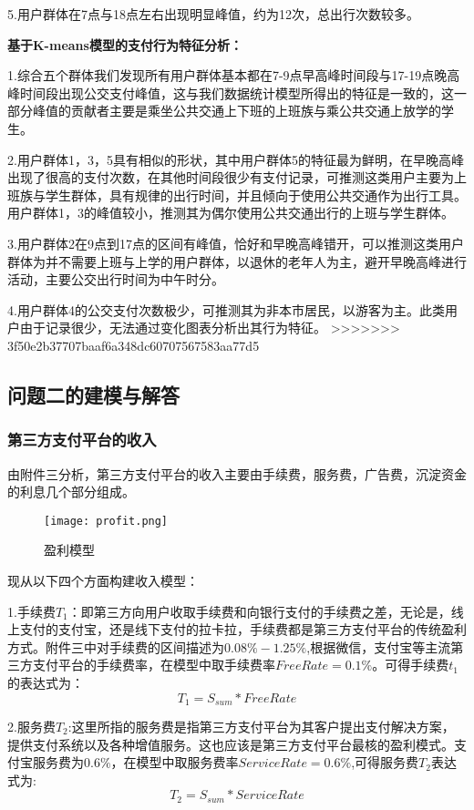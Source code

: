 \documentclass[withoutpreface,bwprint]{cumcmthesis} %
\begin{document}
5.用户群体在7点与18点左右出现明显峰值，约为12次，总出行次数较多。

\textbf{基于K-means模型的支付行为特征分析：}

1.综合五个群体我们发现所有用户群体基本都在7-9点早高峰时间段与17-19点晚高峰时间段出现公交支付峰值，这与我们数据统计模型所得出的特征是一致的，这一部分峰值的贡献者主要是乘坐公共交通上下班的上班族与乘公共交通上放学的学生。

2.用户群体1，3，5具有相似的形状，其中用户群体5的特征最为鲜明，在早晚高峰出现了很高的支付次数，在其他时间段很少有支付记录，可推测这类用户主要为上班族与学生群体，具有规律的出行时间，并且倾向于使用公共交通作为出行工具。用户群体1，3的峰值较小，推测其为偶尔使用公共交通出行的上班与学生群体。

3.用户群体2在9点到17点的区间有峰值，恰好和早晚高峰错开，可以推测这类用户群体为并不需要上班与上学的用户群体，以退休的老年人为主，避开早晚高峰进行活动，主要公交出行时间为中午时分。

4.用户群体4的公交支付次数极少，可推测其为非本市居民，以游客为主。此类用户由于记录很少，无法通过变化图表分析出其行为特征。
>>>>>>> 3f50e2b37707baaf6a348dc60707567583aa77d5

\subsection{问题二的建模与解答}
\subsubsection{第三方支付平台的收入}
由附件三分析，第三方支付平台的收入主要由手续费，服务费，广告费，沉淀资金的利息几个部分组成。
\begin{figure}[h]
\centering
\texttt{[image: profit.png]}
\caption{盈利模型}
\end{figure}
现从以下四个方面构建收入模型：

1.手续费$T_1$：即第三方向用户收取手续费和向银行支付的手续费之差，无论是，线上支付的支付宝，还是线下支付的拉卡拉，手续费都是第三方支付平台的传统盈利方式。附件三中对手续费的区间描述为$0.08\%-1.25\%$,根据微信，支付宝等主流第三方支付平台的手续费率，在模型中取手续费率$FreeRate=0.1\%$。可得手续费$t_1$的表达式为：
\begin{equation}
T_1=S_{sum}*FreeRate
\end{equation}

2.服务费$T_2$:这里所指的服务费是指第三方支付平台为其客户提出支付解决方案，提供支付系统以及各种增值服务。这也应该是第三方支付平台最核的盈利模式。支付宝服务费为$0.6\%$，在模型中取服务费率$ServiceRate=​0.6\%$,可得服务费$T_2$表达式为:
\begin{equation}
T_2=S_{sum}*ServiceRate
\end{equation}
\end{document}

